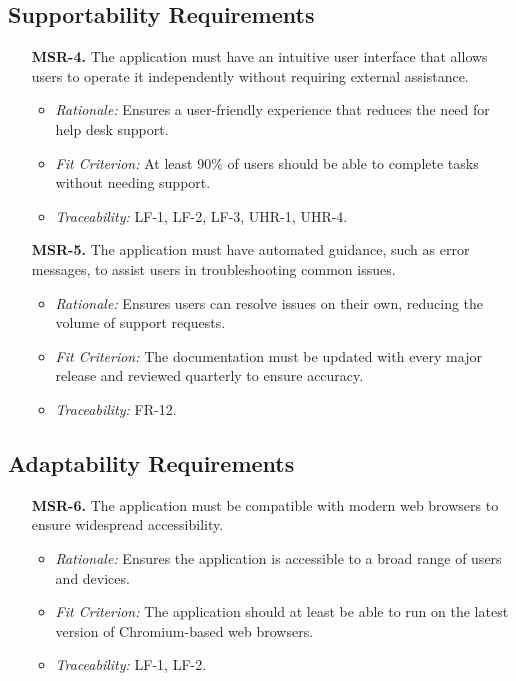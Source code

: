 \documentclass[12pt]{article}
\begin{document}
\subsection{Supportability Requirements}
\begin{enumerate}
  \item[\textbf{MSR-4.}] 
  The application must have an intuitive user interface that allows users to
  operate it independently without requiring external assistance.
  \begin{itemize}
    \item \textit{Rationale:} Ensures a user-friendly experience that reduces
    the need for help desk support.
    \item \textit{Fit Criterion:} At least 90\% of users should be able to
    complete tasks without needing support.
    \item \textit{Traceability:} LF-1, LF-2, LF-3, UHR-1, UHR-4.
  \end{itemize}

  \item[\textbf{MSR-5.}] The application must have automated guidance, such as
  error messages, to assist users in troubleshooting common issues.
  \begin{itemize}
    \item \textit{Rationale:} Ensures users can resolve issues on their own,
    reducing the volume of support requests.
    \item \textit{Fit Criterion:} The documentation must be updated with every
    major release and reviewed quarterly to ensure accuracy.
    \item \textit{Traceability:} FR-12.
  \end{itemize}
\end{enumerate}

\subsection{Adaptability Requirements}
\begin{enumerate}
  \item[\textbf{MSR-6.}] The application must be compatible with modern web
  browsers to ensure widespread accessibility.
  \begin{itemize}
    \item \textit{Rationale:} Ensures the application is accessible to a broad
    range of users and devices.
    \item \textit{Fit Criterion:} The application should at least be able to run
    on the latest version of Chromium-based web browsers.
    \item \textit{Traceability:} LF-1, LF-2.
  \end{itemize}
\end{enumerate}
\end{document}
